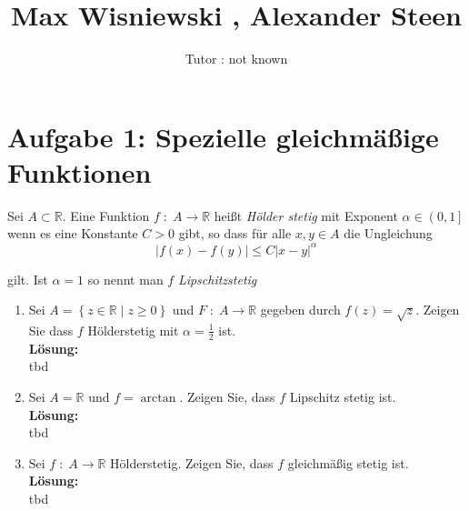 \documentclass[11pt,a4paper,ngerman]{article}
\date{}
\title{Max Wisniewski , Alexander Steen}
\author{Tutor : not known}
\begin{document}

\maketitle
\thispagestyle{fancy}


\section*{Aufgabe 1: \mdseries Spezielle gleichmäßige Funktionen}

Sei $A \subset \mathbb{R}$. Eine Funktion $f \; : \; A \rightarrow \mathbb{R}$ heißt \emph{Hölder stetig} mit Exponent $\alpha \in \left( 0,1 \right]$ wenn es eine Konstante $C > 0$ gibt, so dass für alle $x,y \in A$ die Ungleichung
$$
    \left| f(x) - f(y)\right| \leq C \left| x - y \right|^\alpha
$$

gilt. Ist $\alpha = 1$ so nennt man $f$ \emph{Lipschitzstetig}

\begin{enumerate}[\bfseries a)]
    \item Sei $A=\left\{ z \in \mathbb{R} \; | \; z \geq 0 \right\}$ und $F \; : \; A \rightarrow \mathbb {R}$ gegeben durch $f(z) = \sqrt{z}$. Zeigen Sie dass $f$ Hölderstetig mit $\alpha = \frac{1}{2}$ ist.\\

\textbf{Lösung:}\\

tbd

    \item Sei $A=\mathbb{R}$ und $f=\arctan$. Zeigen Sie, dass $f$ Lipschitz stetig ist.\\

\textbf{Lösung:}\\

tbd

    \item Sei $f \; : \; A \rightarrow \mathbb{R}$ Hölderstetig. Zeigen Sie, dass $f$ gleichmäßig stetig ist.\\

\textbf{Lösung:}\\

tbd
\end{enumerate}
\end{document}
